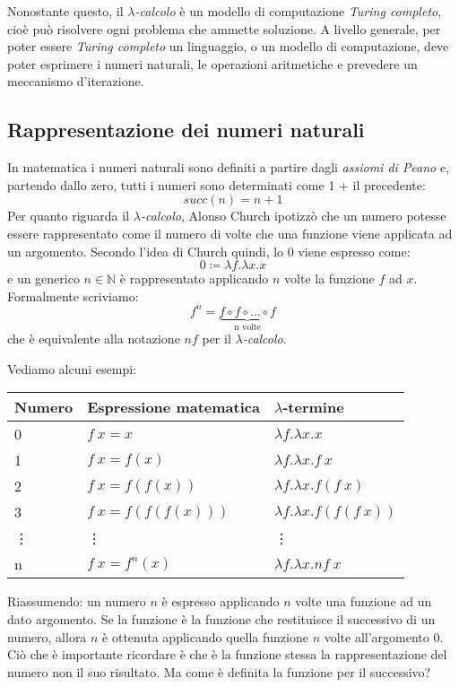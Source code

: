 \documentclass[12pt, a4paper]{report}
\theoremstyle{definition}
\begin{document}
Nonostante questo, il \emph{$\lambda$-calcolo} è un modello di computazione
\emph{Turing completo}, cioè può risolvere ogni problema che ammette soluzione.
A livello generale, per poter essere \emph{Turing completo} un linguaggio, o un
modello di computazione, deve poter esprimere i numeri naturali, le operazioni
aritmetiche e prevedere un meccanismo d'iterazione.

\subsection{Rappresentazione dei numeri naturali}
In matematica i numeri naturali sono definiti a partire dagli \emph{assiomi di
Peano} e, partendo dallo zero, tutti i numeri sono determinati come 1 + il precedente:
\[succ(n)=n+1\]
Per quanto riguarda il \emph{$\lambda$-calcolo}, Alonso Church ipotizzò che un
numero potesse essere rappresentato come il numero di volte che una funzione viene
applicata ad un argomento. Secondo l'idea di Church quindi, lo $0$ viene espresso
come:
\[0\coloneqq\lambda f.\lambda x.x\]
e un generico $n\in\mathbb{N}$ è rappresentato applicando $n$ volte la funzione
$f$ ad $x$. Formalmente scriviamo:
\[f^n=\underbrace{f\circ f\circ\dots \circ f}_\text{n volte}\]
che è equivalente alla notazione $nf$ per il \emph{$\lambda$-calcolo}.

Vediamo alcuni esempi:

\begin{center}
    \begin{tabular}{|l|l|l|}
        \hline
        \textbf{Numero} & \textbf{Espressione matematica} & \textbf{$\lambda$-termine}\\
        \hline
        0 & $f\ x = x$ & $\lambda f.\lambda x.x$\\
        1 & $f\ x = f(x)$ & $\lambda f.\lambda x.f\ x$\\
        2 & $f\ x = f(f(x))$ & $\lambda f.\lambda x.f(f\ x)$\\
        3 & $f\ x = f(f(f(x)))$ & $\lambda f.\lambda x.f(f(f\ x))$\\
        \vdots & \vdots & \vdots\\
        n & $f\ x = f^n(x)$ & $\lambda f.\lambda x.nf\ x$\\
        \hline
    \end{tabular}
\end{center}
Riassumendo: un numero $n$ è espresso applicando $n$ volte una funzione ad
un dato argomento. Se la funzione è la funzione che restituisce il successivo di
un numero, allora $n$ è ottenuta applicando quella funzione $n$ volte all'argomento
$0$. Ciò che è importante ricordare è che è la funzione stessa la rappresentazione
del numero non il suo risultato.
\newpage
\noindent
Ma come è definita la funzione per il successivo?
\end{document}
